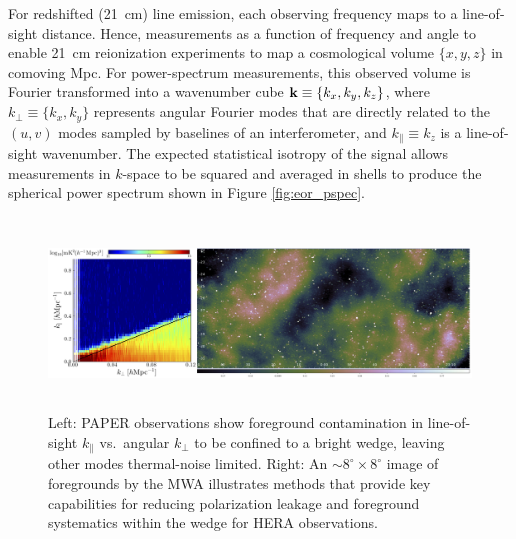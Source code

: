 \documentclass[preprint]{aastex}
\newcommand{\Caption}[4]{\vspace{#1}\renewcommand{\baselinestretch}{#2}\caption{#4}\vspace{#3}}
\def\kperp{k_{\bot}}
\def\kpar{k_{\|}}
\def\kperp{k_{\bot}}
\def\kpar{k_{\|}}
\def\k{{\bf k}}
\begin{document}
For redshifted (21~cm) line emission, each observing frequency maps to
a line-of-sight distance.  Hence, measurements as a function of frequency and angle 
to enable 21~cm reionization experiments to map a cosmological volume $\{x,y,z\}$ in
comoving Mpc.  For power-spectrum measurements, this observed volume is Fourier transformed into a 
wavenumber cube $\k\equiv\{k_{x}, k_{y}, k_{z}\}$, where 
$\kperp\equiv\{k_{x},k_{y}\}$ represents angular Fourier modes that are directly
related to the $(u,v)$ modes sampled by baselines of an interferometer, and $\kpar\equiv k_{z}$ is
a line-of-sight wavenumber.
The expected statistical isotropy of the signal allows measurements in $k$-space to be
squared and averaged in shells to produce the spherical power spectrum
shown in Figure \ref{fig:eor_pspec}.

\begin{figure}[t] \centering
\includegraphics[height=2in]{plots/Foregrounds/MWA_wedge_consolidated.jpg}
\Caption{-0.3in}{0.9}{-0.15in}{\small Left:
PAPER observations \citep{pober_et_al2013} show foreground contamination 
in line-of-sight $\kpar$ vs.\ angular $\kperp$ to be
confined to a bright wedge,
leaving other modes thermal-noise limited.
Right:
An $\sim8^{\circ} \times 8^{\circ}$ image of foregrounds by the MWA illustrates
methods that provide key capabilities for reducing
polarization leakage and foreground systematics within the wedge for HERA observations.  
}\label{fig:twoFGViews} \end{figure}
\end{document}
